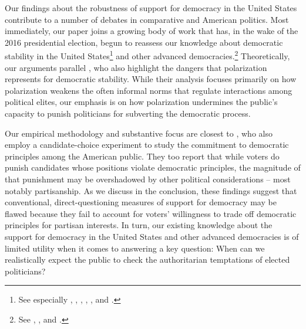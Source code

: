 \documentclass[letterpaper, 12pt]{article}
\begin{document}
\begin{raggedright}
Our findings about the robustness of support for democracy in the United States contribute to a number of debates in comparative and American politics. Most immediately, our paper joins a growing body of work that has, in the wake of the 2016 presidential election, begun to reassess our knowledge about democratic stability in the United States\footnote{See especially \citet{Carey2018}, \citet{HuqGinsburg2017}, \citet{KaufmanHaggardForthcoming}, \citet{LiebermanMettlerPepinskyEtAlForthcoming}, \citet{Miller2017}, and \citet{Przeworski2019}.} and other advanced democracies.\footnote{See \citet{BecherBrouard2019}, \citet{Foa2017}, and \citet{Voeten2017}.} Theoretically, our arguments parallel \citet{Levitsky2018}, who also highlight the dangers that polarization represents for democratic stability. While their analysis focuses primarily on how polarization weakens the often informal norms that regulate interactions among political elites, our emphasis is on how polarization undermines the public's capacity to punish politicians for subverting the democratic process.

Our empirical methodology and substantive focus are closest to \citet{Carey2018a}, who also employ a candidate-choice experiment to study the commitment to democratic principles among the American public. They too report that while voters do punish candidates whose positions violate democratic principles, the magnitude of that punishment may be overshadowed by other political considerations -- most notably partisanship. As we discuss in the conclusion, these findings suggest that conventional, direct-questioning measures of support for democracy may be flawed because they fail to account for voters' willingness to trade off democratic principles for partisan interests. In turn, our existing knowledge about the support for democracy in the United States and other advanced democracies is of limited utility when it comes to answering a key question: When can we realistically expect the public to check the authoritarian temptations of elected politicians?


\end{raggedright}
\end{document}
